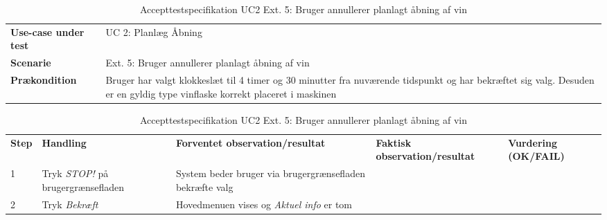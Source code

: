 \begin{table}[H]
	\centering
	\caption{Accepttestspecifikation UC2 Ext. 5: Bruger annullerer planlagt åbning af vin}
	\label{ATUC2:Ext2}
	\begin{tabular}{ p{80pt}  p{320pt} }\hline
		\rowcolor{lightgray}	
		\textbf{Use-case under test} & UC 2: Planlæg Åbning \\
		\rowcolor{white}
		\textbf{Scenarie} & Ext. 5: Bruger annullerer planlagt åbning af vin \\\rowcolor{lightgray}	
		\textbf{Prækondition} &
		Bruger har valgt klokkeslæt til 4 timer og 30 minutter fra nuværende tidspunkt og har bekræftet sig valg. Desuden er en gyldig type vinflaske korrekt placeret i maskinen \\
		\hline
	\end{tabular}
	\begin{tabular}{  p{26pt} p{100pt}  p{101pt} | p{67pt} | p{68pt}}
		\textbf{Step} & \textbf{Handling} & \textbf{Forventet observation/resultat} & \textbf{Faktisk observation/resultat} & \textbf{Vurdering (OK/FAIL)}\\
		1 & Tryk \emph{STOP!} på brugergrænsefladen & System beder bruger via brugergrænsefladen bekræfte valg
 &  &  \\
 		2 & Tryk \emph{Bekræft} & Hovedmenuen vises og \emph{Aktuel info} er tom \\
		\hline
	\end{tabular}
\end{table}



